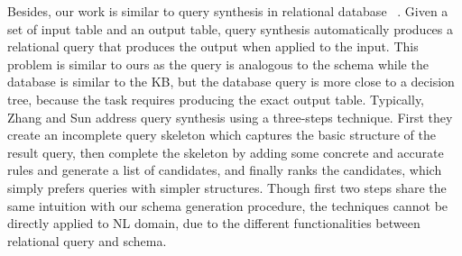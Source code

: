 


Besides, our work is similar to query synthesis in relational database~
\cite{niehren2013query,das2010synthesizing,cheung2012inferring,cheung2013optimizing}. 
Given a set of input table and an output table,
query synthesis automatically produces a relational query that produces the output when applied to the input. 
This problem is similar to ours as the query is analogous to the schema
while the database is similar to the KB, but the database query is
more close to a decision tree, because the task requires producing the exact output table.
Typically, Zhang and Sun  
address query synthesis using a three-steps technique.
First they create an incomplete query skeleton which captures the basic structure of the result query,
then complete the skeleton by adding some concrete and accurate rules and generate a list of candidates,
and finally ranks the candidates, which simply prefers queries with simpler structures.
Though first two steps share the same intuition with our schema generation procedure,
the techniques cannot be directly applied to NL domain,
due to the different functionalities between relational query and schema.

